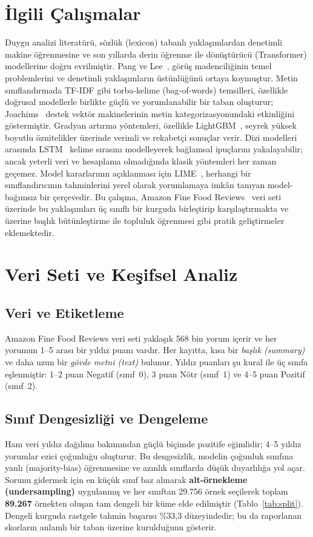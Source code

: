 \documentclass[conference]{IEEEtran}
\begin{document}
\section{İlgili Çalışmalar}
Duygu analizi literatürü, sözlük (lexicon) tabanlı yaklaşımlardan denetimli
makine öğrenmesine ve son yıllarda derin öğrenme ile dönüştürücü (Transformer)
modellerine doğru evrilmiştir. Pang ve Lee~\cite{pang}, görüş madenciliğinin
temel problemlerini ve denetimli yaklaşımların üstünlüğünü ortaya koymuştur.
Metin sınıflandırmada TF-IDF gibi torba-kelime (bag-of-words) temsilleri,
özellikle doğrusal modellerle birlikte güçlü ve yorumlanabilir bir taban
oluşturur; Joachims~\cite{svm} destek vektör makinelerinin metin
kategorizasyonundaki etkinliğini göstermiştir. Gradyan artırma yöntemleri,
özellikle LightGBM~\cite{lgbm}, seyrek yüksek boyutlu öznitelikler üzerinde
verimli ve rekabetçi sonuçlar verir. Dizi modelleri arasında LSTM~\cite{lstm}
kelime sırasını modelleyerek bağlamsal ipuçlarını yakalayabilir; ancak yeterli
veri ve hesaplama olmadığında klasik yöntemleri her zaman geçemez. Model
kararlarının açıklanması için LIME~\cite{lime}, herhangi bir sınıflandırıcının
tahminlerini yerel olarak yorumlamaya imkân tanıyan model-bağımsız bir çerçevedir.
Bu çalışma, Amazon Fine Food Reviews~\cite{mcauley} veri seti üzerinde bu
yaklaşımları üç sınıflı bir kurguda birleştirip karşılaştırmakta ve üzerine
başlık bütünleştirme ile topluluk öğrenmesi gibi pratik geliştirmeler eklemektedir.

\section{Veri Seti ve Keşifsel Analiz}
\subsection{Veri ve Etiketleme}
Amazon Fine Food Reviews veri seti yaklaşık 568 bin yorum içerir ve her yorumun
1--5 arası bir yıldız puanı vardır. Her kayıtta, kısa bir \emph{başlık (summary)}
ve daha uzun bir \emph{gövde metni (text)} bulunur. Yıldız puanları şu kural ile üç
sınıfa eşlenmiştir: 1--2 puan Negatif (sınıf~0), 3 puan Nötr (sınıf~1) ve 4--5 puan
Pozitif (sınıf~2).

\subsection{Sınıf Dengesizliği ve Dengeleme}
Ham veri yıldız dağılımı bakımından güçlü biçimde pozitife eğimlidir; 4--5 yıldız
yorumlar ezici çoğunluğu oluşturur. Bu dengesizlik, modelin çoğunluk sınıfına
yanlı (majority-bias) öğrenmesine ve azınlık sınıflarda düşük duyarlılığa yol
açar. Sorunu gidermek için en küçük sınıf baz alınarak \textbf{alt-örnekleme
(undersampling)} uygulanmış ve her sınıftan 29.756 örnek seçilerek toplam
\textbf{89.267} örnekten oluşan tam dengeli bir küme elde edilmiştir
(Tablo~\ref{tab:split}). Dengeli kurguda rastgele tahmin başarısı \%33,3
düzeyindedir; bu da raporlanan skorların anlamlı bir taban üzerine kurulduğunu
gösterir.
\end{document}

